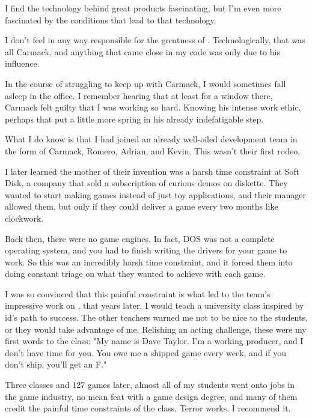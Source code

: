 I find the technology behind great products fascinating, but I'm even more fascinated by the conditions that lead to that technology.\\
\par
I don't feel in any way responsible for the greatness of \doom{}.  Technologically, that was all Carmack, and anything that came close in my code was only due to his influence.\\
\par
In the course of struggling to keep up with Carmack, I would sometimes fall asleep in the office.  I remember hearing that at least for a window there, Carmack felt guilty that I was working so hard.  Knowing his intense work ethic, perhaps that put a little more spring in his already indefatigable step.\\
\par
What I do know is that I had joined an already well-oiled development team in the form of Carmack, Romero, Adrian, and Kevin.  This wasn't their first rodeo.\\
\par
I later learned the mother of their invention was a harsh time constraint at Soft Disk, a company that sold a subscription of curious demos on diskette.  They wanted to start making games instead of just toy applications, and their manager allowed them, but only if they could deliver a game every two months like clockwork.\\
\par
Back then, there were no game engines.  In fact, DOS was not a complete operating system, and you had to finish writing the drivers for your game to work.  So this was an incredibly harsh time constraint, and it forced them into doing constant triage on what they wanted to achieve with each game.\\
\par
I was so convinced that this painful constraint is what led to the team's impressive work on \doom{}, that years later, I would teach a university class inspired by id's path to success.  The other teachers warned me not to be nice to the students, or they would take advantage of me.  Relishing an acting challenge, these were my first words to the class: "My name is Dave Taylor.  I'm a working producer, and I don't have time for you.  You owe me a shipped game every week, and if you don't ship, you'll get an F."\\
\par
Three classes and 127 games later, almost all of my students went onto jobs in the game industry, no mean feat with a game design degree, and many of them credit the painful time constraints of the class.  Terror works.  I recommend it.\\
